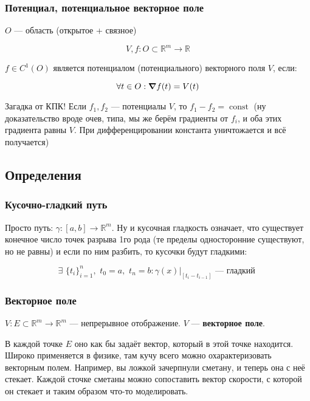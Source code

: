 \documentclass{article}
\def\dbl{\,\,}
\DeclareMathOperator{\const}{const}
\begin{document}
\subsubsection{Потенциал, потенциальное векторное поле}
$O$ --- область (открытое + связное)

\[V, f: O \subset \mathbb{R}^m \rightarrow \mathbb{R}\]

$f \in C^1(O)$ является потенциалом (потенциального) векторного поля $V$, если:

\[\forall t \in O: \grad f(t) = V(t)\]

Загадка от КПК! Если $f_1, f_2$ --- потенциалы $V$, то $f_1 - f_2 = \const$ (ну доказательство вроде очев, типа, мы же берём градиенты от $f_i$, и оба этих градиента равны $V$. При дифференцировании константа уничтожается и всё получается)

\newpage

\subsection{Определения}

\subsubsection{Кусочно-гладкий путь}

Просто путь: $\gamma: [a, b] \rightarrow \mathbb{R}^m$. Ну и кусочная гладкость означает, что существует конечное число точек разрыва 1го рода (те пределы односторонние существуют, но не равны) и если по ним разбить, то кусочки будут гладкими:

\[\exists \dbl \{t_i\}_{i = 1}^n, \dbl t_0 = a, \dbl t_n = b: \gamma(x)|_{[t_i - t_{i - 1}]} \text{ --- гладкий }\]

\subsubsection{Векторное поле}

$V: E \subset \mathbb{R}^m \rightarrow \mathbb{R}^m$ --- непрерывное отображение. $V$ --- \textbf{векторное поле}.

В каждой точке $E$ оно как бы задаёт вектор, который в этой точке находится. Широко применяется в физике, там кучу всего можно охарактеризовать векторным полем. Например, вы ложкой зачерпнули сметану, и теперь она с неё стекает. Каждой сточке сметаны можно сопоставить вектор скорости, с которой он стекает и таким образом что-то моделировать.
\end{document}
